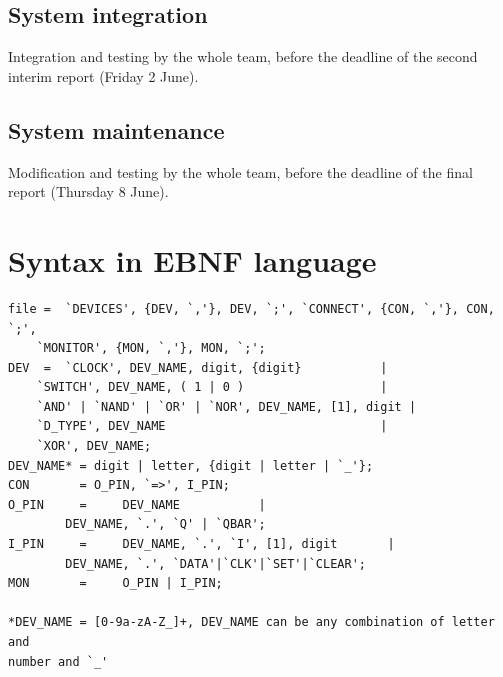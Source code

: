 \documentclass[12pt]{article}
\begin{document}
\subsection{System integration}
Integration and testing by the whole team, before the deadline of the second interim report (Friday 2 June).

\subsection{System maintenance}
Modification and testing by the whole team, before the deadline of the final report (Thursday 8 June).

\section{Syntax in EBNF language}
\begin{lstlisting}[basicstyle=\small]
file =  `DEVICES', {DEV, `,'}, DEV, `;', `CONNECT', {CON, `,'}, CON, `;',
	`MONITOR', {MON, `,'}, MON, `;';
DEV  =  `CLOCK', DEV_NAME, digit, {digit}  			|
	`SWITCH', DEV_NAME, ( 1 | 0 )          			|
	`AND' | `NAND' | `OR' | `NOR', DEV_NAME, [1], digit	|
	`D_TYPE', DEV_NAME                  			|
	`XOR', DEV_NAME;
DEV_NAME* =	digit | letter, {digit | letter | `_'};
CON       =	O_PIN, `=>', I_PIN;
O_PIN     =  	DEV_NAME		   |
		DEV_NAME, `.', `Q' | `QBAR';
I_PIN     =  	DEV_NAME, `.', `I', [1], digit		 |
		DEV_NAME, `.', `DATA'|`CLK'|`SET'|`CLEAR';
MON       =     O_PIN | I_PIN;

*DEV_NAME = [0-9a-zA-Z_]+, DEV_NAME can be any combination of letter and 
number and `_'

\end{lstlisting}
\end{document}
